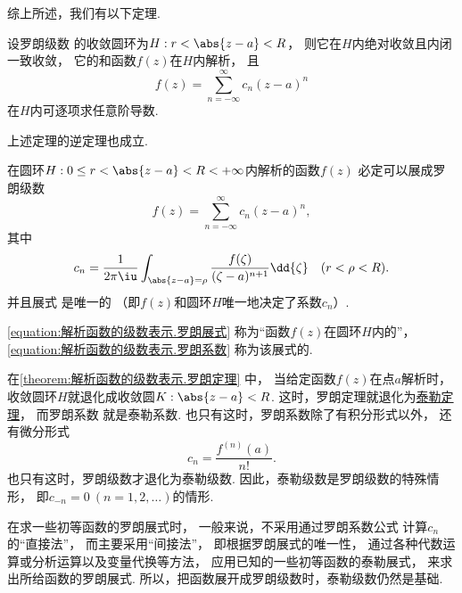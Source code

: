 综上所述，我们有以下定理.
\begin{theorem}
设罗朗级数  的收敛圆环为\(H: r < \abs{z-a} < R\)，
则它在\(H\)内绝对收敛且内闭一致收敛，
它的和函数\(f(z)\)在\(H\)内解析，
且\begin{equation*}
	f(z) = \sum_{n=-\infty}^\infty c_n (z-a)^n
\end{equation*}在\(H\)内可逐项求任意阶导数.
\end{theorem}

上述定理的逆定理也成立.
\begin{theorem}[罗朗定理]\label{theorem:解析函数的级数表示.罗朗定理}
在圆环\(H: 0 \leq r < \abs{z-a} < R < +\infty\)内解析的函数\(f(z)\)
必定可以展成罗朗级数\begin{equation}\label{equation:解析函数的级数表示.罗朗展式}
	f(z) = \sum_{n=-\infty}^\infty c_n (z-a)^n,
\end{equation}
其中\begin{equation}\label{equation:解析函数的级数表示.罗朗系数}
	c_n = \frac{1}{2\pi\iu} \int_{\abs{z-a}=\rho} \frac{f(\zeta)}{(\zeta-a)^{n+1}} \dd{\zeta}
	\quad(r<\rho<R).
\end{equation}
并且展式  是唯一的
（即\(f(z)\)和圆环\(H\)唯一地决定了系数\(c_n\)）.
\end{theorem}
\cref{equation:解析函数的级数表示.罗朗展式}
称为“函数\(f(z)\)在圆环\(H\)内的”，
\cref{equation:解析函数的级数表示.罗朗系数}
称为该展式的.

在\cref{theorem:解析函数的级数表示.罗朗定理} 中，
当给定函数\(f(z)\)在点\(a\)解析时，
收敛圆环\(H\)就退化成收敛圆\(K: \abs{z-a}<R\).
这时，罗朗定理就退化为\hyperref[theorem:解析函数的级数表示.泰勒定理]{泰勒定理}，
而罗朗系数  就是泰勒系数.
也只有这时，罗朗系数除了有积分形式以外，
还有微分形式\begin{equation*}
	c_n = \frac{f^{(n)}(a)}{n!}.
\end{equation*}
也只有这时，罗朗级数才退化为泰勒级数.
因此，泰勒级数是罗朗级数的特殊情形，
即\(c_{-n} = 0\ (n=1,2,\dotsc)\)的情形.

在求一些初等函数的罗朗展式时，
一般来说，不采用通过罗朗系数公式  计算\(c_n\)的“直接法”，
而主要采用“间接法”，
即根据罗朗展式的唯一性，
通过各种代数运算或分析运算以及变量代换等方法，
应用已知的一些初等函数的泰勒展式，
来求出所给函数的罗朗展式.
所以，把函数展开成罗朗级数时，泰勒级数仍然是基础.

